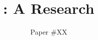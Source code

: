 \documentclass[letterpaper,twocolumn,10pt]{article}
\begin{document}

\date{}

\title{\Large \bf \name: A Research}

\author{
{\rm Paper \#XX}\\
} %

\maketitle

\begin{abstract}

\end{abstract}












\end{document}
